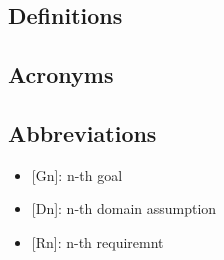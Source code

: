 \subsection{Definitions}

\subsection{Acronyms}
	
\subsection{Abbreviations }
	\begin{itemize}
		\item {[Gn]: n-th goal}
		\item {[Dn]: n-th domain assumption}
		\item {[Rn]: n-th requiremnt}
	\end{itemize}


